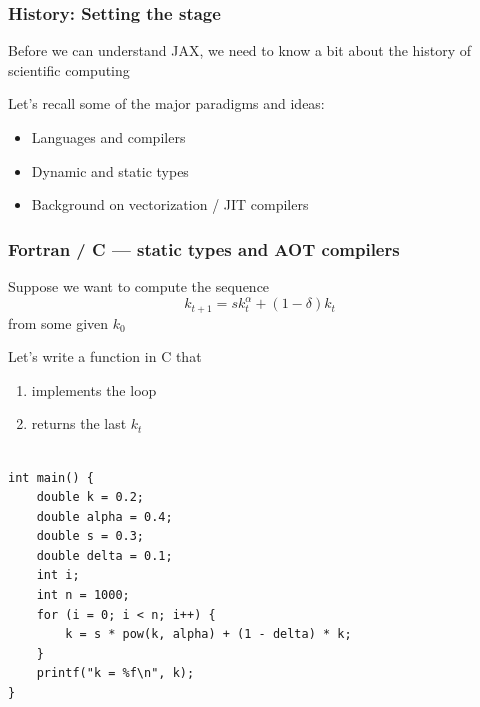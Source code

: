 \begin{frame}
    \frametitle{History: Setting the stage}

    Before we can understand JAX, we need to know a bit about the history of scientific
    computing

    \vspace{0.5em}
    Let's recall some of the major paradigms and ideas:

    \vspace{0.5em}
    \begin{itemize}
        \item Languages and compilers
    \vspace{0.5em}
        \item Dynamic and static types
    \vspace{0.5em}
        \item Background on vectorization / JIT compilers
    \end{itemize}

\end{frame}
    


\begin{frame}
    \frametitle{Fortran / C  --- static types and AOT compilers}


    \Eg Suppose we want to compute the sequence
    \begin{equation*}
        k_{t+1} = s k_t^\alpha + (1 - \delta) k_t
    \end{equation*}
    from some given $k_0$ 

        \vspace{0.5em}
        \vspace{0.5em}
        \vspace{0.5em}

    Let's write a function in C that 
    \begin{enumerate}
        \item implements the loop 
        \vspace{0.5em}
        \item returns the last $k_t$
    \end{enumerate}


\end{frame}


\begin{frame}[fragile]
    
    \begin{verbatim}

int main() {
    double k = 0.2;
    double alpha = 0.4;
    double s = 0.3;
    double delta = 0.1;
    int i;
    int n = 1000;
    for (i = 0; i < n; i++) {
        k = s * pow(k, alpha) + (1 - delta) * k;
    }
    printf("k = %f\n", k);
}
    \end{verbatim}

\end{frame}



